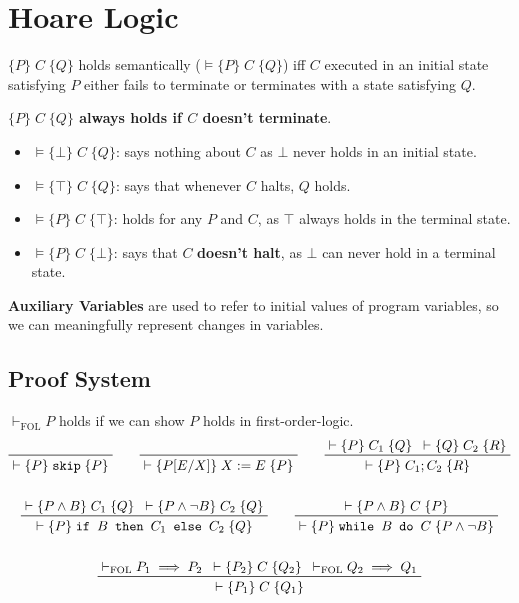 \documentclass[a4paper, 11pt]{article}
\newcommand{\triple}[3]{\{#1\}\;#2\;\{#3\}}
\newcommand{\triplem}[3]{\(\triple{#1}{#2}{#3}\)}
\begin{document}
\section*{Hoare Logic}
{
    \triplem{P}{C}{Q} holds semantically (\(\vDash \triple{P}{C}{Q}\)) iff \(C\) executed in an initial state satisfying \(P\) either fails to terminate or terminates with a state satisfying \(Q\).

    \textbf{\(\{P\}\;C\;\{Q\}\) always holds if \(C\) doesn't terminate}.

    \begin{itemize}
    \item \(\vDash \triple{\bot}{C}{Q}\): says nothing about \(C\) as \(\bot\) never holds in an initial state.
    \item \(\vDash \triple{\top}{C}{Q}\): says that whenever \(C\) halts, \(Q\) holds.
    \item \(\vDash \triple{P}{C}{\top}\): holds for any \(P\) and \(C\), as \(\top\) always holds in the terminal state.
    \item \(\vDash \triple{P}{C}{\bot}\): says that \(C\) \textbf{doesn't halt}, as \(\bot\) can never hold in a terminal state.
    \end{itemize}

    \textbf{Auxiliary Variables} are used to refer to initial values of program variables, so we can meaningfully represent changes in variables.

    \subsection*{Proof System}
    {
        \(\vdash_\text{FOL}P\) holds if we can show \(P\) holds in first-order-logic.
        \begin{gather*}
        \prftree[r]{}
        {\vdash \triple{P}{\texttt{skip}}{P}}
        \qquad
        \prftree[r]{}
        {\vdash \triple{P[E/X]}{X := E}{P}}
        \qquad
        \prftree[r]{}
        {\vdash \triple{P}{C_1}{Q}}
        {\vdash \triple{Q}{C_2}{R}}
        {\vdash \triple{P}{C_1;C_2}{R}}
        \\
        \\
        \prftree[r]{}
        {\vdash \triple{P \wedge B}{C_1}{Q}}
        {\vdash \triple{P \wedge \neg B}{C_2}{Q}}
        {\vdash \triple{P}{\texttt{if }B\texttt{ then }C_1\texttt{ else }C_2}{Q}}
        \qquad
        \prftree[r]{}
        {\vdash \triple{P \wedge B}{C}{P}}
        {\vdash \triple{P}{\texttt{while }B\texttt{ do }C}{P \wedge \neg B}}
        \\
        \\
        \prftree[r]{}
        {\vdash_\text{FOL} P_1 \implies P_2}
        {\vdash \triple{P_2}{C}{Q_2}}
        {\vdash_\text{FOL} Q_2 \implies Q_1}
        {\vdash \triple{P_1}{C}{Q_1}}
        \end{gather*}
    }
}
\end{document}
